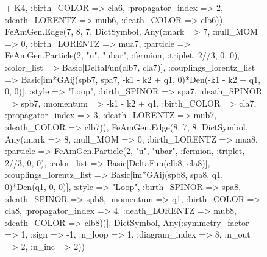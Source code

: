 \documentclass{revtex4}
\begin{document}
\begin{figure}[!htb]
\begin{center}
{+ K4, :birth_COLOR => cla6, :propagator_index => 2, :death_LORENTZ => mub6, :death_COLOR => clb6)), FeAmGen.Edge(7, 8, 7, Dict{Symbol, Any}(:mark => 7, :null_MOM => 0, :birth_LORENTZ => mua7, :particle => FeAmGen.Particle(2, "u", "ubar", :fermion, :triplet, 2//3, 0, 0), :color_list => Basic[DeltaFun(clb7, cla7)], :couplings_lorentz_list => Basic[im*GAij(spb7, spa7, -k1 - k2 + q1, 0)*Den(-k1 - k2 + q1, 0, 0)], :style => "Loop", :birth_SPINOR => spa7, :death_SPINOR => spb7, :momentum => -k1 - k2 + q1, :birth_COLOR => cla7, :propagator_index => 3, :death_LORENTZ => mub7, :death_COLOR => clb7)), FeAmGen.Edge(8, 7, 8, Dict{Symbol, Any}(:mark => 8, :null_MOM => 0, :birth_LORENTZ => mua8, :particle => FeAmGen.Particle(2, "u", "ubar", :fermion, :triplet, 2//3, 0, 0), :color_list => Basic[DeltaFun(clb8, cla8)], :couplings_lorentz_list => Basic[im*GAij(spb8, spa8, q1, 0)*Den(q1, 0, 0)], :style => "Loop", :birth_SPINOR => spa8, :death_SPINOR => spb8, :momentum => q1, :birth_COLOR => cla8, :propagator_index => 4, :death_LORENTZ => mub8, :death_COLOR => clb8))], Dict{Symbol, Any}(:symmetry_factor => 1, :sign => -1, :n_loop => 1, :diagram_index => 8, :n_out => 2, :n_inc => 2)) 
}
\end{center}
\end{figure}
\end{document}
